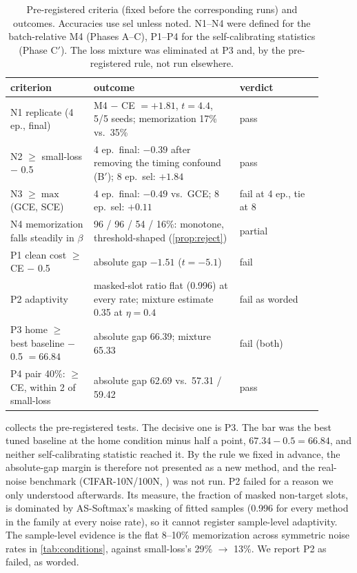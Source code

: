 \begin{table}[t]
\centering
\caption{Pre-registered criteria (fixed before the corresponding runs) and outcomes. Accuracies
use sel unless noted. N1--N4 were defined for the batch-relative M4 (Phases A--C), P1--P4 for the
self-calibrating statistics (Phase C$'$). The loss mixture was eliminated at P3 and, by the
pre-registered rule, not run elsewhere.}
\label{tab:verdicts}
\small
\begin{tabular}{p{0.24\linewidth}p{0.42\linewidth}p{0.24\linewidth}}
\toprule
criterion & outcome & verdict \\
\midrule
N1 replicate (4 ep., final) & M4 $-$ CE $= +1.81$, $t = 4.4$, 5/5 seeds; memorization 17\% vs.\ 35\% & pass \\
N2 $\ge$ small-loss $-$ 0.5 & 4 ep.\ final: $-0.39$ after removing the timing confound (B$'$); 8 ep.\ sel: $+1.84$ & pass \\
N3 $\ge \max$(GCE, SCE) & 4 ep.\ final: $-0.49$ vs.\ GCE; 8 ep.\ sel: $+0.11$ & fail at 4 ep., tie at 8 \\
N4 memorization falls steadily in $\beta$ & 96 / 96 / 54 / 16\%: monotone, threshold-shaped (\cref{prop:reject}) & partial \\
\midrule
P1 clean cost $\ge$ CE $-$ 0.5 & absolute gap $-1.51$ ($t = -5.1$) & fail \\
P2 adaptivity & masked-slot ratio flat (0.996) at every rate; mixture estimate 0.35 at $\eta = 0.4$ & fail as worded \\
P3 home $\ge$ best baseline $-$ 0.5 $= 66.84$ & absolute gap 66.39; mixture 65.33 & fail (both) \\
P4 pair 40\%: $\ge$ CE, within 2 of small-loss & absolute gap 62.69 vs.\ 57.31 / 59.42 & pass \\
\bottomrule
\end{tabular}
\end{table}

 collects the pre-registered tests. The decisive one is P3. The bar was the best
tuned baseline at the home condition minus half a point, $67.34 - 0.5 = 66.84$, and neither
self-calibrating statistic reached it. By the rule we fixed in advance, the absolute-gap margin is
therefore not presented as a new method, and the real-noise benchmark (CIFAR-10N/100N,
\citealp{wei2022cifarn}) was not run. P2 failed for a reason we only understood afterwards. Its
measure, the fraction of masked non-target slots, is dominated by AS-Softmax's masking of fitted
samples (0.996 for every method in the family at every noise rate), so it cannot register sample-level
adaptivity. The sample-level evidence is the flat 8--10\% memorization across symmetric noise rates
in \cref{tab:conditions}, against small-loss's 29\% $\to$ 13\%. We report P2 as failed, as worded.

